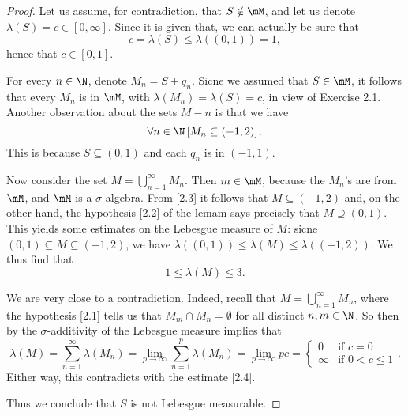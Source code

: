 \documentclass[pmath450]{subfiles}
\begin{document}
    \begin{proof}
        Let us assume, for contradiction, that $S\notin\mM$, and let us denote $\lambda\left( S \right)=c\in\left[ 0,\infty \right]$. Since it is given that, we can actually be sure that
        \begin{equation*}
            c = \lambda\left( S \right)\leq\lambda\left( \left( 0,1 \right) \right)=1,
        \end{equation*}
        hence that $c\in\left[ 0,1 \right]$.

        For every $n\in\N$, denote $M_n=S+q_n$. Sicne we assumed that $S\in\mM$, it follows that every $M_n$ is in $\mM$, with $\lambda\left( M_n \right)=\lambda\left( S \right)=c$, in view of Exercise 2.1. Another observation about the sets $M-n$ is that we have
        \begin{equation}
            \forall n\in\N\left[ M_n\subseteq\left( -1,2 \right) \right].
        \end{equation}
        This is because $S\subseteq\left( 0,1 \right)$ and each $q_n$ is in $\left( -1,1 \right)$.

        Now consider the set $M=\bigcup^{\infty}_{n=1}M_n$. Then $m\in\mM$, because the $M_n$'s are from $\mM$, and $\mM$ is a $\sigma$-algebra. From [2.3] it follows that $M\subseteq\left( -1,2 \right)$ and, on the other hand, the hypothesis [2.2] of the lemam says precisely that $M\supseteq\left( 0,1 \right)$. This yields some estimates on the Lebesgue measure of $M$: sicne $\left( 0,1 \right)\subseteq M\subseteq\left( -1,2 \right)$, we have $\lambda\left( \left( 0,1 \right) \right)\leq\lambda\left( M \right)\leq\lambda\left( \left( -1,2 \right) \right)$. We thus find that
        \begin{equation}
            1\leq\lambda\left( M \right)\leq 3.
        \end{equation}

        We are very close to a contradiction. Indeed, recall that $M=\bigcup^{\infty}_{n=1}M_n$, where the hypothesis [2.1] tells us that $M_m\cap M_n=\emptyset$ for all distinct $n,m\in\N$. So then by the $\sigma$-additivity of the Lebesgue measure implies that
        \begin{equation*}
            \lambda\left( M \right)= \sum^{\infty}_{n=1}\lambda\left( M_n \right) = \lim_{p\to\infty}\sum^{p}_{n=1}\lambda\left( M_n \right)=\lim_{p\to\infty}pc =
            \begin{cases} 
                0 &\text{if $c=0$}\\
                \infty &\text{if $0<c\leq 1$}
            \end{cases}.
        \end{equation*}
        Either way, this contradicts with the estimate [2.4]. 

        Thus we conclude that $S$ is not Lebesgue measurable.
    \end{proof}
\end{document}
